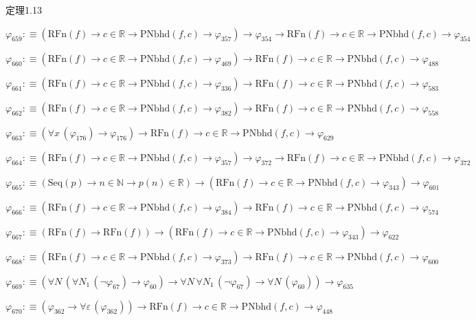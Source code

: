 \begin{fullproof}{定理1.13}
\begin{abbrevlist}
\item $\varphi_{659} :\equiv (\mathrm{RFn}(f) \to c \in \mathbb{R} \to \mathrm{PNbhd}(f,c) \to \varphi_{357}) \to \varphi_{354} \to \mathrm{RFn}(f) \to c \in \mathbb{R} \to \mathrm{PNbhd}(f,c) \to \varphi_{354}$
\item $\varphi_{660} :\equiv (\mathrm{RFn}(f) \to c \in \mathbb{R} \to \mathrm{PNbhd}(f,c) \to \varphi_{469}) \to \mathrm{RFn}(f) \to c \in \mathbb{R} \to \mathrm{PNbhd}(f,c) \to \varphi_{488}$
\item $\varphi_{661} :\equiv (\mathrm{RFn}(f) \to c \in \mathbb{R} \to \mathrm{PNbhd}(f,c) \to \varphi_{336}) \to \mathrm{RFn}(f) \to c \in \mathbb{R} \to \mathrm{PNbhd}(f,c) \to \varphi_{583}$
\item $\varphi_{662} :\equiv (\mathrm{RFn}(f) \to c \in \mathbb{R} \to \mathrm{PNbhd}(f,c) \to \varphi_{382}) \to \mathrm{RFn}(f) \to c \in \mathbb{R} \to \mathrm{PNbhd}(f,c) \to \varphi_{558}$
\item $\varphi_{663} :\equiv (\forall x\,(\varphi_{176}) \to \varphi_{176}) \to \mathrm{RFn}(f) \to c \in \mathbb{R} \to \mathrm{PNbhd}(f,c) \to \varphi_{629}$
\item $\varphi_{664} :\equiv (\mathrm{RFn}(f) \to c \in \mathbb{R} \to \mathrm{PNbhd}(f,c) \to \varphi_{357}) \to \varphi_{372} \to \mathrm{RFn}(f) \to c \in \mathbb{R} \to \mathrm{PNbhd}(f,c) \to \varphi_{372}$
\item $\varphi_{665} :\equiv (\mathrm{Seq}(p) \to n \in \mathbb{N} \to p(n) \in \mathbb{R}) \to (\mathrm{RFn}(f) \to c \in \mathbb{R} \to \mathrm{PNbhd}(f,c) \to \varphi_{343}) \to \varphi_{601}$
\item $\varphi_{666} :\equiv (\mathrm{RFn}(f) \to c \in \mathbb{R} \to \mathrm{PNbhd}(f,c) \to \varphi_{384}) \to \mathrm{RFn}(f) \to c \in \mathbb{R} \to \mathrm{PNbhd}(f,c) \to \varphi_{574}$
\item $\varphi_{667} :\equiv (\mathrm{RFn}(f) \to \mathrm{RFn}(f)) \to (\mathrm{RFn}(f) \to c \in \mathbb{R} \to \mathrm{PNbhd}(f,c) \to \varphi_{343}) \to \varphi_{622}$
\item $\varphi_{668} :\equiv (\mathrm{RFn}(f) \to c \in \mathbb{R} \to \mathrm{PNbhd}(f,c) \to \varphi_{373}) \to \mathrm{RFn}(f) \to c \in \mathbb{R} \to \mathrm{PNbhd}(f,c) \to \varphi_{600}$
\item $\varphi_{669} :\equiv (\forall N\,(\forall N_{1}\,(\neg \varphi_{67}) \to \varphi_{60}) \to \forall N\,\forall N_{1}\,(\neg \varphi_{67}) \to \forall N\,(\varphi_{60})) \to \varphi_{635}$
\item $\varphi_{670} :\equiv (\varphi_{362} \to \forall \varepsilon\,(\varphi_{362})) \to \mathrm{RFn}(f) \to c \in \mathbb{R} \to \mathrm{PNbhd}(f,c) \to \varphi_{448}$

\end{abbrevlist}
\end{fullproof}
